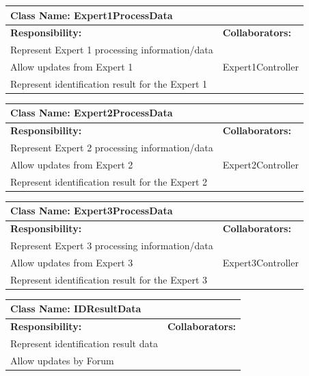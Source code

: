 \documentclass[]{article}
\begin{document}
	\begin{table}[ht]
		\centering
		\begin{tabular}{|p{5cm}|p{5cm}|}
		\hline 
		 \multicolumn{2}{|l|}{\textbf{Class Name: Expert1ProcessData}} \\
		\hline
		\textbf{Responsibility:} & \textbf{Collaborators:} \\
		\hline
		Represent Expert 1 processing information/data &  \\
		\hline
		Allow updates from Expert 1 & Expert1Controller \\
		\hline
		Represent identification result for the Expert 1 &  \\
		\hline
		\end{tabular}
	\end{table}
	
\newpage
	\begin{table}[ht]
		\centering
		\begin{tabular}{|p{5cm}|p{5cm}|}
		\hline 
		 \multicolumn{2}{|l|}{\textbf{Class Name: Expert2ProcessData}} \\
		\hline
		\textbf{Responsibility:} & \textbf{Collaborators:} \\
		\hline
		Represent Expert 2 processing information/data &  \\
		\hline
		Allow updates from Expert 2 & Expert2Controller \\
		\hline
		Represent identification result for the Expert 2 &  \\
		\hline
		\end{tabular}
	\end{table}
	
	\begin{table}[ht]
		\centering
		\begin{tabular}{|p{5cm}|p{5cm}|}
		\hline 
		 \multicolumn{2}{|l|}{\textbf{Class Name: Expert3ProcessData}} \\
		\hline
		\textbf{Responsibility:} & \textbf{Collaborators:} \\
		\hline
		Represent Expert 3 processing information/data &  \\
		\hline
		Allow updates from Expert 3 & Expert3Controller \\
		\hline
		Represent identification result for the Expert 3 &  \\
		\hline
		\end{tabular}
	\end{table}
	
	\begin{table}[ht]
		\centering
		\begin{tabular}{|p{5cm}|p{5cm}|}
		\hline 
		 \multicolumn{2}{|l|}{\textbf{Class Name: IDResultData}} \\
		\hline
		\textbf{Responsibility:} & \textbf{Collaborators:} \\
		\hline
		Represent identification result data &  \\
		\hline
		Allow updates by Forum &  \\
		\hline
		\end{tabular}
	\end{table}
	
\end{document}
